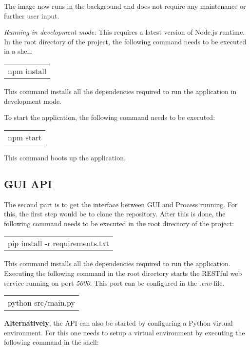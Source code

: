 The image now runs in the background and does not require any maintenance or further user input.

\textit{Running in development mode:} This requires a latest version of Node.js runtime. In the root directory of the project, the following command needs to be executed in a shell:

\vspace{2mm}
\begin{tabular}{l}
	npm install
\end{tabular}
\vspace{2mm}

This command installs all the dependencies required to run the application in development mode.

To start the application, the following command needs to be executed:
\vspace{2mm}

\begin{tabular}{l}
	npm start
\end{tabular}
\vspace{2mm}

This command boots up the application.

\subsection*{GUI API}
The second part is to get the interface between GUI and Process running. For this, the first step would be to clone the repository. After this is done, the following command needs to be executed in the root directory of the project: 

\vspace{2mm}
\begin{tabular}{l}
	pip install -r requirements.txt
\end{tabular}
\vspace{2mm}

This command installs all the dependencies required to run the application. Executing the following command in the root directory starts the RESTful web service running on port \textit{5000}. This port can be configured in the \textit{.env} file. 

\vspace{2mm}
\begin{tabular}{l}
	python src/main.py 
\end{tabular}
\vspace{2mm}

\textbf{Alternatively}, the API can also be started by configuring a Python virtual environment. For this one needs to setup a virtual environment by executing the following command in the shell: 

